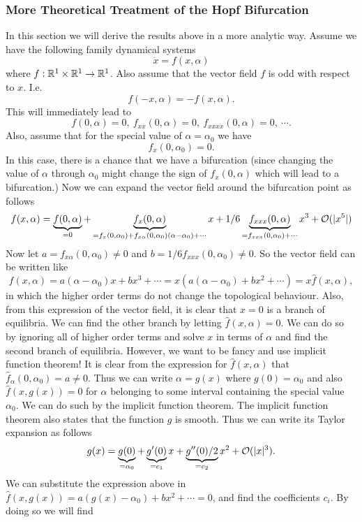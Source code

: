 \subsubsection*{More Theoretical Treatment of the Hopf Bifurcation}
In this section we will derive the results above in a more analytic way. Assume we have the following family dynamical systems
\[ \dot{x} = f(x,\alpha) \]
where $f:\mathbb{R}^1 \times \mathbb{R}^1 \to \mathbb{R}^1$. Also assume that the vector field $f$ is odd with respect to $x$. I.e.
\[ f(-x,\alpha) = -f(x,\alpha). \]
This will immediately lead to 
\[ f(0,\alpha) = 0,\ f_{xx}(0,\alpha) = 0,\ f_{xxxx}(0,\alpha) = 0,\ \cdots. \]
Also, assume that for the special value of $\alpha = \alpha_0$ we have
\[ f_x(0,\alpha_0) = 0. \]
In this case, there is a chance that we have a bifurcation (since changing the value of $\alpha$ through $\alpha_0$ might change the sign of $f_x(0,\alpha)$ which will lead to a bifurcation.) Now we can expand the vector field around the bifurcation point as follows
\[ f(x,\alpha) = \underbrace{f(0,\alpha)}_{=0} + \underbrace{f_x(0,\alpha)}_{=f_{x}(0,\alpha_0) + f_{x\alpha}(0,\alpha_0)(\alpha - \alpha_0)+\cdots}x + 1/6\underbrace{f_{xxx}(0,\alpha)}_{=f_{xxx}(0,\alpha_0)+\cdots}x^3 + \mathcal{O}(|x^5|) \]
Now let $a = f_{x\alpha}(0,\alpha_0) \neq 0 $ and $b = 1/6 f_{xxx}(0,\alpha_0) \neq 0$. So the vector field can be written like
\[ f(x,\alpha) = a(\alpha-\alpha_0)x + bx^3 + \cdots = x (a(\alpha-\alpha_0)+bx^2 + \cdots)=  x\hat{f}(x,\alpha), \]
in which the higher order terms do not change the topological behaviour. Also, from this expression of the vector field, it is clear that $x=0$ is a branch of equilibria. We can find the other branch by letting $\hat{f}(x,\alpha) = 0$. We can do so by ignoring all of higher order terms and solve $x$ in terms of $\alpha$ and find the second branch of equilibria. However, we want to be fancy and use implicit function theorem! It is clear from the expression for $\hat{f}(x,\alpha)$ that $\hat{f}_\alpha(0,\alpha_0) = a \neq 0$. Thus we can write $\alpha = g(x)$ where $g(0) =\alpha_0$ and also $\hat{f}(x,g(x)) = 0$ for $\alpha$ belonging to some interval containing the special value $\alpha_0$. We can do such by the implicit function theorem. The implicit function theorem also states that the function $g$ is smooth. Thus we can write its Taylor expansion as follows
\[ g(x) =\underbrace{ g(0)}_{=\alpha_0} + \underbrace{g'(0)}_{=c_1}x + \underbrace{g''(0)/2}_{=c_2}x^2+ \mathcal{O}(|x|^3). \]
We can substitute the expression above in $\hat{f}(x,g(x)) = a(g(x)-\alpha_0) + bx^2 + \cdots = 0$, and find the coefficients $c_i$. By doing so we will find
